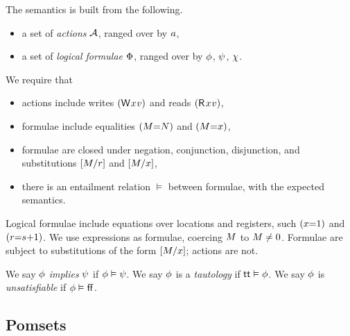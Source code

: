 The semantics is built from the following.
\begin{itemize}
\item a set of \emph{actions} $\mathcal{A}$, ranged over by $a$, 
\item a set of \emph{logical formulae} $\Phi$, ranged over by $\phi$,
  $\psi$, $\chi$.
\end{itemize}
We require that
\begin{itemize}
\item actions include writes $\DWP{\aLoc}{\aVal}$ and reads $\DRP{\aLoc}{\aVal}$,
\item formulae include equalities $(M{=}N)$ and $(M{=}x)$,
\item formulae are closed under negation, conjunction, disjunction, and
  substitutions $[M/r]$ and $[M/x]$, 
\item there is an entailment relation $\vDash$ between formulae, with the
  expected semantics.
\end{itemize}


Logical formulae include equations over locations and registers, such
$(x{=}1)$ and $(r{=}s{+}1)$.
We use expressions as formulae, coercing $M$ to $M\neq 0$.
Formulae are subject to substitutions of the form $[M/x]$; actions are not.

  We say
  $\phi$ \emph{implies} $\psi$ if $\phi\vDash\psi$.
  We say
  $\phi$ is a \emph{tautology} if $\mathsf{tt}\vDash\phi$.
  We say
  $\phi$ is \emph{unsatisfiable} if $\phi\vDash\mkern.6mu\mathsf{ff}\mkern.6mu$.




\subsection{Pomsets}

